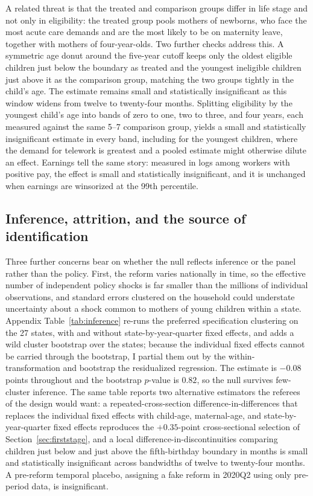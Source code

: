 \documentclass[12pt]{article}
\begin{document}
A related threat is that the treated and comparison groups differ in life stage and not only in eligibility: the treated group pools mothers of newborns, who face the most acute care demands and are the most likely to be on maternity leave, together with mothers of four-year-olds. Two further checks address this. A symmetric age donut around the five-year cutoff keeps only the oldest eligible children just below the boundary as treated and the youngest ineligible children just above it as the comparison group, matching the two groups tightly in the child's age. The estimate remains small and statistically insignificant as this window widens from twelve to twenty-four months. Splitting eligibility by the youngest child's age into bands of zero to one, two to three, and four years, each measured against the same 5--7 comparison group, yields a small and statistically insignificant estimate in every band, including for the youngest children, where the demand for telework is greatest and a pooled estimate might otherwise dilute an effect. Earnings tell the same story: measured in logs among workers with positive pay, the effect is small and statistically insignificant, and it is unchanged when earnings are winsorized at the 99th percentile.

\subsection{Inference, attrition, and the source of identification}\label{sec:inference}

Three further concerns bear on whether the null reflects inference or the panel rather than the policy. First, the reform varies nationally in time, so the effective number of independent policy shocks is far smaller than the millions of individual observations, and standard errors clustered on the household could understate uncertainty about a shock common to mothers of young children within a state. Appendix Table~\ref{tab:inference} re-runs the preferred specification clustering on the 27 states, with and without state-by-year-quarter fixed effects, and adds a wild cluster bootstrap over the states; because the individual fixed effects cannot be carried through the bootstrap, I partial them out by the within-transformation and bootstrap the residualized regression. The estimate is $-0.08$ points throughout and the bootstrap $p$-value is $0.82$, so the null survives few-cluster inference. The same table reports two alternative estimators the referees of the design would want: a repeated-cross-section difference-in-differences that replaces the individual fixed effects with child-age, maternal-age, and state-by-year-quarter fixed effects reproduces the $+0.35$-point cross-sectional selection of Section~\ref{sec:firststage}, and a local difference-in-discontinuities comparing children just below and just above the fifth-birthday boundary in months is small and statistically insignificant across bandwidths of twelve to twenty-four months. A pre-reform temporal placebo, assigning a fake reform in 2020Q2 using only pre-period data, is insignificant.
\end{document}
